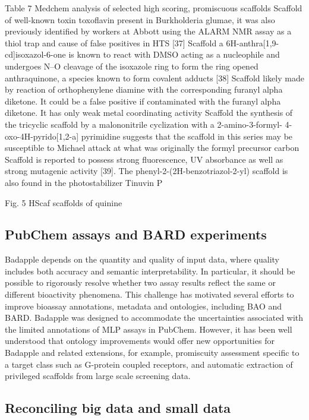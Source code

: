 Table 7 Medchem analysis of selected high scoring, promiscuous scaffolds
Scaffold of well-known toxin toxoflavin present in Burkholderia glumae, it was also previously identified by workers at Abbott using the ALARM NMR assay as a thiol trap and cause of false positives in HTS [37]
Scaffold a 6H-anthra[1,9-cd]isoxazol-6-one is known to react with DMSO acting as a nucleophile and undergoes N–O cleavage of the isoxazole ring to form the ring opened anthraquinone, a species known to form covalent adducts [38]
Scaffold likely made by reaction of orthophenylene diamine with the corresponding furanyl alpha diketone. It could be a false positive if contaminated with the furanyl alpha diketone. It has only weak metal coordinating activity
Scaffold the synthesis of the tricyclic scaffold by a malononitrile cyclization with a 2-amino-3-formyl- 4-oxo-4H-pyrido[1,2-a] pyrimidine suggests that the scaffold in this series may be susceptible to Michael attack at what was originally the formyl precursor carbon
Scaffold is reported to possess strong fluorescence, UV absorbance as well as strong mutagenic activity [39]. The phenyl-2-(2H-benzotriazol-2-yl) scaffold is also found in the photostabilizer Tinuvin P


Fig. 5 HScaf scaffolds of quinine




\subsection{PubChem assays and BARD experiments
}
Badapple depends on the quantity and quality of input data, where quality includes both accuracy and semantic interpretability. In particular, it should be possible to rigorously resolve whether two assay results reflect the same or different bioactivity phenomena. This challenge has motivated several efforts to improve bioassay annotations, metadata and ontologies, including BAO and BARD. Badapple was designed to accommodate the uncertainties associated with the limited annotations of MLP assays in PubChem. However, it has been well understood that ontology improvements would offer new opportunities for Badapple and related extensions, for example, promiscuity assessment specific to a target class such as G-protein coupled receptors, and automatic extraction of privileged scaffolds from large scale screening data.

\subsection{Reconciling big data and small data}

